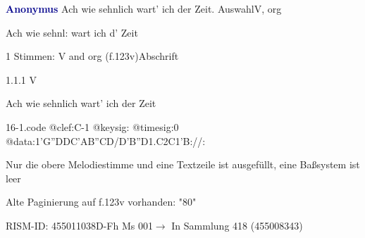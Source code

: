 \documentclass[twocolumn]{book}
\begin{document}
\par \vspace{7pt} \textcolor{darkblue}{\textbf{Anonymus  }}\hfillplus{\textbf{[16]}}\newline Ach wie sehnlich wart' ich der Zeit. Auswahl\newline V, org
\par \begin{itshape}[f.123v, heading:] Ach wie sehnl: wart ich d' Zeit\end{itshape} 
\par \textcolor{darkblue}{}  1 Stimmen: V and org  (f.123v)\newline Abschrift
\par 1.1.1  V\newline \begin{footnotesize} Ach wie sehnlich wart' ich der Zeit \end{footnotesize}  
\begin{filecontents*}{16-1.code}
@clef:C-1
@keysig:
@timesig:0
@data:1'G''DDC'AB''CD/D'B''D1.C2C1'B://:
\end{filecontents*}
\newline
%
\par Nur die obere Melodiestimme und eine Textzeile ist ausgefüllt, eine Baßsystem ist leer
\par Alte Paginierung auf f.123v vorhanden: "80"
\par RISM-ID: 455011038\newline D-Fh  Ms 001\newline $\rightarrow$ In Sammlung 418 (455008343)
      
\end{document}
